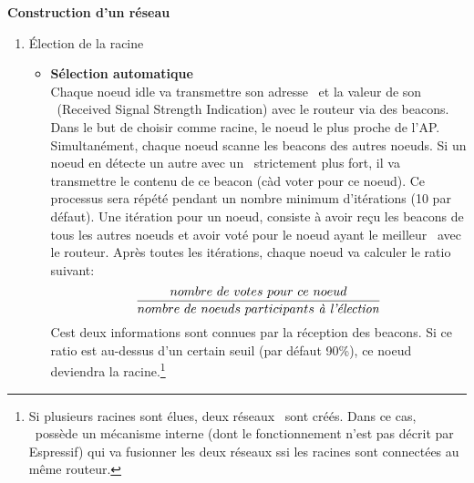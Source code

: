         \textbf{Construction d'un réseau}
        \newline
        \begin{enumerate}
            \item \'Election de la racine
                \begin{itemize}
                    \item \textbf{Sélection automatique}\\
                        Chaque noeud idle va transmettre son adresse \mac\ et
                        la valeur de son \rssi\ (Received Signal Strength Indication) avec le routeur via des beacons.
                        Dans le but de choisir comme racine, le noeud le plus proche de l'AP.
                        Simultanément, chaque noeud scanne les beacons des autres noeuds. Si un noeud
                        en détecte un autre avec un \rssi\ strictement plus fort, il va transmettre le contenu de
                        ce beacon (càd voter pour ce noeud).
                        Ce processus sera répété pendant un nombre minimum d'itérations (10 par défaut).
                        Une itération pour un noeud, consiste à avoir reçu les beacons de tous les autres noeuds
                        et avoir voté pour le noeud ayant le meilleur \rssi\ avec le routeur.
                        Après toutes les itérations, chaque noeud va calculer le ratio suivant: 
                        \[\frac{nombre\ de\ votes\ pour\ ce\ noeud}{nombre\ de\ noeuds\ participants\ \textrm{\textit{à l'élection}}}\]
                        Cest deux informations sont connues par la réception des beacons.
                        Si ce ratio est au-dessus d'un certain seuil (par défaut 90\%), ce noeud deviendra la racine.\footnote{
                            Si plusieurs racines sont élues, deux réseaux \espmesh\ sont créés.
                            Dans ce cas, \espmesh\ possède un mécanisme interne (dont le fonctionnement n'est pas décrit par Espressif) qui va fusionner les deux réseaux
                            ssi les racines sont connectées au même routeur.
                        }




\end{itemize}
\end{enumerate}
